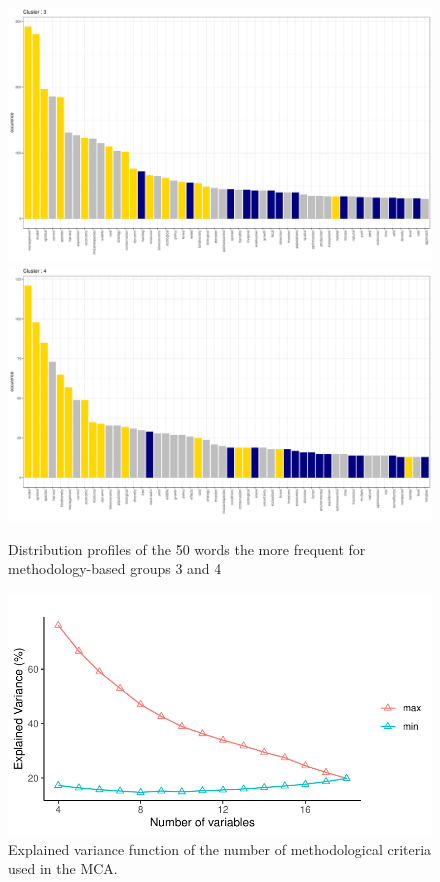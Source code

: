 \begin{figure}[h]
\centering
\includegraphics[width = .8\textwidth]{figures/review/occurence_kmodes_3_n50_common.pdf}\\
\includegraphics[width = .8\textwidth]{figures/review/occurence_kmodes_4_n50_common.pdf}\\
\caption{Distribution profiles of the 50 words the more frequent for methodology-based groups 3 and 4}
\label{fig:words-profile-2} 
\end{figure}

\begin{figure}[h]
\includegraphics[width=.8\textwidth]{figures/review/variables_variance_enveloppe.pdf}
\caption{\label{fig:nb-crit-methodo} Explained variance function of the number of methodological criteria used in the MCA.}
\end{figure}

